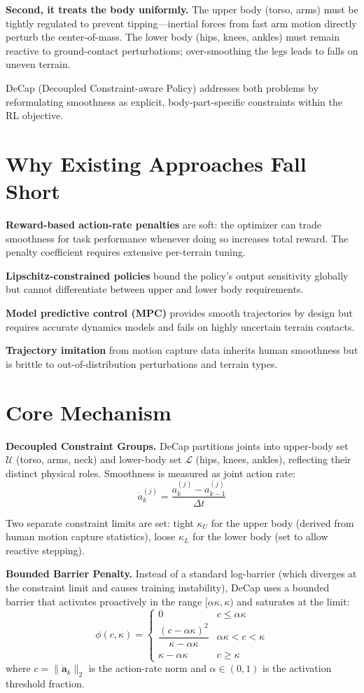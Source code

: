 \documentclass[10pt,twocolumn]{article}
\begin{document}
\textbf{Second, it treats the body uniformly.} The upper body (torso,
arms) must be tightly regulated to prevent tipping---inertial forces
from fast arm motion directly perturb the center-of-mass. The lower body
(hips, knees, ankles) must remain reactive to ground-contact perturbations;
over-smoothing the legs leads to falls on uneven terrain.

DeCap (Decoupled Constraint-aware Policy) addresses both problems by
reformulating smoothness as explicit, body-part-specific constraints
within the RL objective.

\section{Why Existing Approaches Fall Short}

\textbf{Reward-based action-rate penalties} are soft: the optimizer
can trade smoothness for task performance whenever doing so increases
total reward. The penalty coefficient requires extensive per-terrain tuning.

\textbf{Lipschitz-constrained policies} bound the policy's output
sensitivity globally but cannot differentiate between upper and lower
body requirements.

\textbf{Model predictive control (MPC)} provides smooth trajectories by
design but requires accurate dynamics models and fails on highly uncertain
terrain contacts.

\textbf{Trajectory imitation} from motion capture data inherits human
smoothness but is brittle to out-of-distribution perturbations and
terrain types.

\section{Core Mechanism}

\textbf{Decoupled Constraint Groups.} DeCap partitions joints into
upper-body set $\mathcal{U}$ (torso, arms, neck) and lower-body set
$\mathcal{L}$ (hips, knees, ankles), reflecting their distinct physical
roles. Smoothness is measured as joint action rate:
\[
\dot{a}_k^{(j)} = \frac{a_k^{(j)} - a_{k-1}^{(j)}}{\Delta t}
\]

Two separate constraint limits are set: tight $\kappa_U$ for the upper
body (derived from human motion capture statistics), loose $\kappa_L$
for the lower body (set to allow reactive stepping).

\textbf{Bounded Barrier Penalty.} Instead of a standard log-barrier
(which diverges at the constraint limit and causes training instability),
DeCap uses a bounded barrier that activates proactively in the range
$[\alpha\kappa,\kappa)$ and saturates at the limit:
\[
\phi(c,\kappa) = \begin{cases}
0 & c \le \alpha\kappa \\[3pt]
\dfrac{(c-\alpha\kappa)^2}{\kappa-\alpha\kappa} & \alpha\kappa < c < \kappa \\[3pt]
\kappa - \alpha\kappa & c \ge \kappa
\end{cases}
\]
where $c = \|\dot{\mathbf{a}}_k\|_2$ is the action-rate norm and
$\alpha\in(0,1)$ is the activation threshold fraction.
\end{document}

